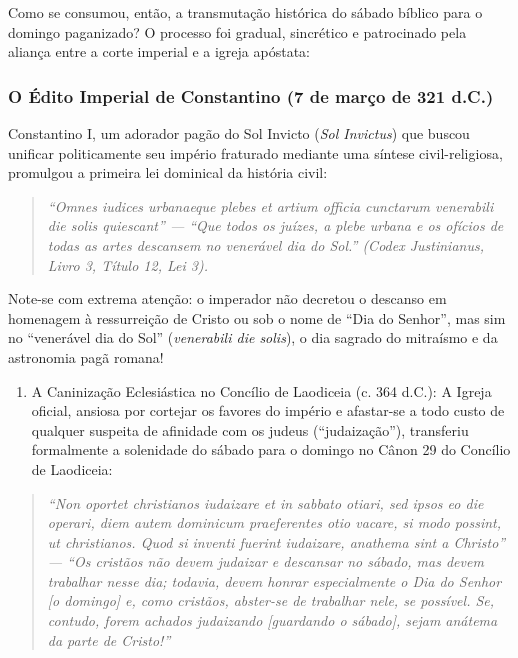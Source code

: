 Como se consumou, então, a transmutação histórica do sábado bíblico para o domingo paganizado? O processo foi gradual, sincrético e patrocinado pela aliança entre a corte imperial e a igreja apóstata:


\subsubsection*{O Édito Imperial de Constantino (7 de março de 321 d.C.)}
Constantino I, um adorador pagão do Sol Invicto (\textit{Sol Invictus}) que buscou unificar politicamente seu império fraturado mediante uma síntese civil-religiosa, promulgou a primeira lei dominical da história civil:

\begin{quote}
\itshape \textit{``Omnes iudices urbanaeque plebes et artium officia cunctarum venerabili die solis quiescant''} — ``Que todos os juízes, a plebe urbana e os ofícios de todas as artes descansem no venerável dia do Sol.'' (\textit{Codex Justinianus}, Livro 3, Título 12, Lei 3).
\end{quote}

Note-se com extrema atenção: o imperador não decretou o descanso em homenagem à ressurreição de Cristo ou sob o nome de ``Dia do Senhor'', mas sim no ``venerável dia do Sol'' (\textit{venerabili die solis}), o dia sagrado do mitraísmo e da astronomia pagã romana!

\begin{enumerate}
  \item A Caninização Eclesiástica no Concílio de Laodiceia (c. 364 d.C.): A Igreja oficial, ansiosa por cortejar os favores do império e afastar-se a todo custo de qualquer suspeita de afinidade com os judeus (``judaização''), transferiu formalmente a solenidade do sábado para o domingo no Cânon 29 do Concílio de Laodiceia:
\end{enumerate}


\begin{quote}
\itshape \textit{``Non oportet christianos iudaizare et in sabbato otiari, sed ipsos eo die operari, diem autem dominicum praeferentes otio vacare, si modo possint, ut christianos. Quod si inventi fuerint iudaizare, anathema sint a Christo''} — ``Os cristãos não devem judaizar e descansar no sábado, mas devem trabalhar nesse dia; todavia, devem honrar especialmente o Dia do Senhor [o domingo] e, como cristãos, abster-se de trabalhar nele, se possível. Se, contudo, forem achados judaizando [guardando o sábado], sejam anátema da parte de Cristo!''
\end{quote}



